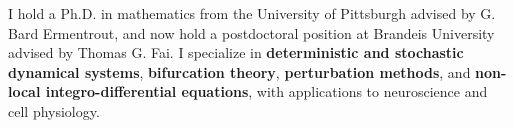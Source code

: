 I hold a Ph.D. in mathematics from the University of Pittsburgh advised by G. Bard Ermentrout, and now hold a postdoctoral position at Brandeis University advised by Thomas G. Fai. I specialize in \textbf{deterministic and stochastic dynamical systems}, \textbf{bifurcation theory}, \textbf{perturbation methods}, and \textbf{non-local integro-differential equations}, with applications to neuroscience and cell physiology.